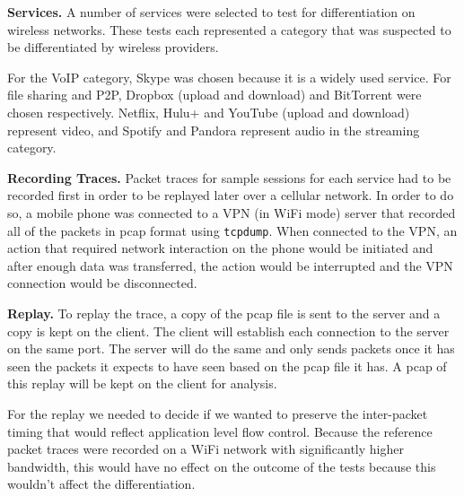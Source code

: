\documentclass[letterpaper]{sig-alternate-10pt}
\begin{document}
\noindent\textbf{Services.}
A number of services were selected to test for differentiation on wireless networks. These tests each represented a category that was suspected to be differentiated by wireless providers.

For the VoIP category, Skype was chosen because it is a widely used service. For file sharing and P2P, Dropbox (upload and download) and BitTorrent were chosen respectively. Netflix, Hulu+ and YouTube (upload and download) represent video, and Spotify and Pandora represent audio in the streaming category.

\noindent\textbf{Recording Traces.}
Packet traces for sample sessions for each service had to be recorded first in order to be replayed later over a cellular network. In order to do so, a mobile phone was connected to a VPN (in WiFi mode) server that recorded all of the packets in pcap format using \texttt{tcpdump}. When connected to the VPN, an action that required network interaction on the phone would be initiated and after enough data was transferred, the action would be interrupted and the VPN connection would be disconnected.



\noindent\textbf{Replay.}
To replay the trace, a copy of the pcap file is sent to the server and a copy is kept on the client. The client will establish each connection to the server on the same port. The server will do the same and only sends packets once it has seen the packets it expects to have seen based on the pcap file it has. A pcap of this replay will be kept on the client for analysis.

For the replay we needed to decide if we wanted to preserve the inter-packet timing that would reflect application level flow control. Because the reference packet traces were recorded on a WiFi network with significantly higher bandwidth, this would have no effect on the outcome of the tests because this wouldn't affect the differentiation.
\end{document}

